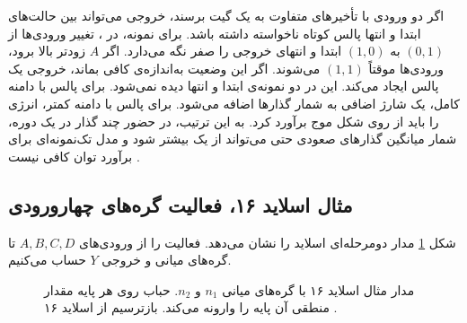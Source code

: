 اگر دو ورودی با تأخیرهای متفاوت به یک گیت برسند، خروجی می‌تواند
بین حالت‌های ابتدا و انتها پالس کوتاه ناخواسته داشته باشد. برای
نمونه، در ، تغییر ورودی‌ها از \((0,1)\) به \((1,0)\)
ابتدا و انتهای خروجی را صفر نگه می‌دارد. اگر \(A\) زودتر بالا
برود، ورودی‌ها موقتاً \((1,1)\) می‌شوند. اگر این وضعیت به‌اندازه‌ی
کافی بماند، خروجی یک پالس ایجاد می‌کند. این  در دو
نمونه‌ی ابتدا و انتها دیده نمی‌شود. برای پالس با دامنه کامل، یک
شارژ اضافی به شمار گذارها اضافه می‌شود. برای پالس با دامنه کمتر،
انرژی را باید از روی شکل موج برآورد کرد. به این ترتیب، در حضور
چند گذار در یک دوره، شمار میانگین گذارهای صعودی حتی می‌تواند از
یک بیشتر شود و مدل تک‌نمونه‌ای برای برآورد توان کافی نیست
\cite[بخش ، صفحه ۱۸۸]{weste}.

\subsection{مثال اسلاید ۱۶، فعالیت گره‌های  چهارورودی}
\label{sec:power-slide-and-activity}

شکل \ref{fig:power-slide-and-activity} مدار دو‌مرحله‌ای اسلاید
را نشان می‌دهد. فعالیت را از ورودی‌های \(A,B,C,D\) تا گره‌های
میانی و خروجی \(Y\) حساب می‌کنیم.

\begin{figure}[htbp]
  \centering
  \begin{latin}
  \end{latin}
  \caption{مدار مثال اسلاید ۱۶ با گره‌های میانی \(n_1\) و \(n_2\).
    حباب روی هر پایه مقدار منطقی آن پایه را وارونه می‌کند.
    بازترسیم از اسلاید ۱۶ \cite{powerslides}.}
  \label{fig:power-slide-and-activity}
\end{figure}

